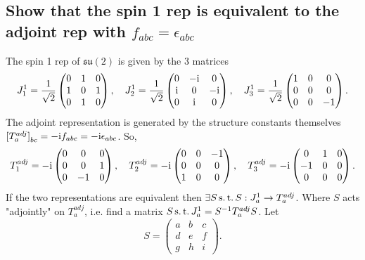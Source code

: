 \documentclass[main.tex]{subfiles}
\begin{document}
\subsection{Show that the spin 1 rep is equivalent to the adjoint rep with $f_{abc}=\epsilon_{abc}$}
The spin 1 rep of $\mathfrak{su}(2)$ is given by the 3 matrices
\begin{equation}
J_1^1=\frac{1}{\sqrt{2}}\begin{pmatrix} 0 & 1 & 0  \\ 1 & 0 & 1 \\ 0 & 1 & 0  \end{pmatrix},\quad
J_2^1=\frac{1}{\sqrt{2}}\begin{pmatrix} 0 & -\mathrm{i} & 0  \\ \mathrm{i} & 0 & -\mathrm{i} \\ 0 & \mathrm{i} & 0  \end{pmatrix},\quad
J_3^1=\frac{1}{\sqrt{2}}\begin{pmatrix} 1 & 0 & 0  \\ 0 & 0 & 0 \\ 0 & 0 & -1  \end{pmatrix}.
\end{equation}
The adjoint representation is generated by the structure constants themselves ${[T_a^{adj}]}_{bc}=-\mathrm{i} f_{abc}=-\mathrm{i}\epsilon_{abc}$. So,
\begin{equation}
T_1^{adj}=-\mathrm{i}\begin{pmatrix} 0 & 0 & 0  \\ 0 & 0 & 1 \\ 0 & -1 & 0  \end{pmatrix},\quad
T_2^{adj}=-\mathrm{i}\begin{pmatrix} 0 & 0 & -1  \\ 0 & 0 & 0 \\ 1 & 0 & 0  \end{pmatrix},\quad
T_3^{adj}=-\mathrm{i}\begin{pmatrix} 0 & 1 & 0  \\ -1 & 0 & 0 \\ 0 & 0 & 0  \end{pmatrix}.
\end{equation}
If the two representations are equivalent then $\exists S \operatorname{s.t.} S:J_a^1\rightarrow T_a^{adj}$. Where $S$ acts "adjointly" on $T_a^{adj}$, i.e. find a matrix $S\operatorname{s.t.} J_a^1=S^{-1}T_a^{adj}S$. Let \begin{equation}
S=\begin{pmatrix}  a & b & c  \\ d & e & f \\ g & h & i  \end{pmatrix}.
\end{equation} 
\end{document}
